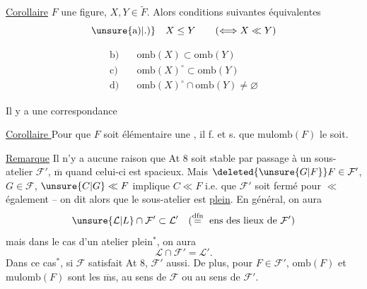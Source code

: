 \uline{Corollaire}  $F$ une figure, $X,Y\in\widetilde F$. Alors conditions suivantes équivalentes
\[
\unsure{\text{a)}|\text{.)}}\quad X\leq Y\qquad(\Longleftrightarrow X\ll Y)
\]

\[
\begin{aligned}
\text{b)}\quad&\mathrm{omb}(X)\subset\mathrm{omb}(Y)\\
\text{c)}\quad&\mathrm{omb}(X)^\circ\subset\mathrm{omb}(Y)\\
\text{d)}\quad&\mathrm{omb}(X)^\circ\cap\mathrm{omb}(Y)\ne\varnothing
\end{aligned}
\]

Il y a une correspondance 

\uline{Corollaire } Pour que $F$ soit élémentaire  une , il f. et s. que $\mathrm{mulomb}(F)$ le soit.

\uline{Remarque} Il n'y a aucune raison que At 8 soit stable par passage à un sous-atelier $\mathcal F'$, $\overline{\mathrm m}$ quand celui-ci est spacieux. Mais   $\deleted{\unsure{G|F}}F\in\mathcal F'$, $G\in\mathcal F$, $\unsure{C|G}\ll F$ implique $C\ll F$ i.e. que $\mathcal F'$ soit fermé pour $\ll$ également -- on dit alors que le sous-atelier est \uline{plein}. En général, on aura
\[
\unsure{\mathcal L|L}\cap\mathcal F'\subset\mathcal L'\quad(\mathrel{\overset{\mathrm{dfn}}{=}}\text{ ens des lieux de }\mathcal F')
\]
mais dans le cas d'un atelier plein$^{*}$, on aura
\[
\mathcal L\cap\mathcal F'=\mathcal L'.
\]
Dans ce cas$^{*}$, si $\mathcal F$ satisfait At 8, $\mathcal F'$ aussi. De plus,  pour $F\in\mathcal F'$, $\mathrm{omb}(F)$ et $\mathrm{mulomb}(F)$ sont les $\overline{\mathrm m}$s, au sens de $\mathcal F$ ou au sens de $\mathcal F'$.


